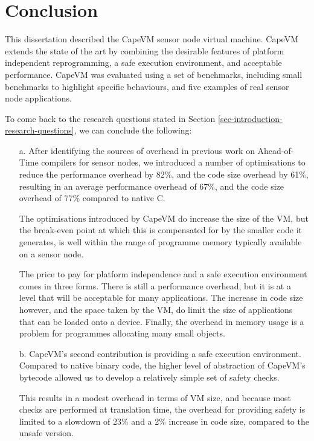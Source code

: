 \chapter{Conclusion}
This dissertation described the CapeVM sensor node virtual machine. CapeVM extends the state of the art by combining the desirable features of platform independent reprogramming, a safe execution environment, and acceptable performance. CapeVM was evaluated using a set of benchmarks, including small benchmarks to highlight specific behaviours, and five examples of real sensor node applications.

To come back to the research questions stated in Section \ref{sec-introduction-research-questions}, we can conclude the following:

\begin{enumerate}
	\item[a.]
	After identifying the sources of overhead in previous work on Ahead-of-Time compilers for sensor nodes, we introduced a number of optimisations to reduce the performance overhead by 82\%, and the code size overhead by 61\%, resulting in an average performance overhead of 67\%, and the code size overhead of 77\% compared to native C.

	The optimisations introduced by CapeVM do increase the size of the VM, but the break-even point at which this is compensated for by the smaller code it generates, is well within the range of programme memory typically available on a sensor node.

	The price to pay for platform independence and a safe execution environment comes in three forms. There is still a performance overhead, but it is at a level that will be acceptable for many applications. The increase in code size however, and the space taken by the VM, do limit the size of applications that can be loaded onto a device. Finally, the overhead in memory usage is a problem for programmes allocating many small objects.

	\item[b.]
	CapeVM's second contribution is providing a safe execution environment. Compared to native binary code, the higher level of abstraction of CapeVM's bytecode allowed us to develop a relatively simple set of safety checks.
	
	This results in a modest overhead in terms of VM size, and because most checks are performed at translation time, the overhead for providing safety is limited to a slowdown of 23\% and a 2\% increase in code size, compared to the unsafe version.
	

\end{enumerate}
